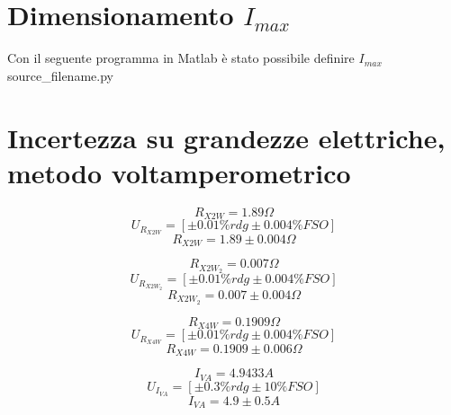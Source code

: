 \documentclass[a4paper]{article}
\begin{document}
\section{Dimensionamento $I_{max}$}
Con il seguente programma in Matlab è stato possibile definire $I_{max}$
{source_filename.py}
\section {Incertezza su grandezze elettriche, metodo voltamperometrico}

\begin{Large}
	\begin{equation}
		R_{X2W}= 1.89 \Omega
	\end{equation}
	\begin{equation}
		U_{R_{X2W}} = [\pm 0.01\%rdg \pm 0.004\% FSO]
	 \end{equation}
	 \begin{equation}
		R_{X2W} = 1.89 \pm 0.004 \Omega
	 \end{equation}
\end{Large}

\begin{Large}
	\begin{equation}
		R_{X2W_{2}} = 0.007 \Omega
	 \end{equation}
	\begin{equation}
		U_{R_{X2W_{2}}} = [\pm 0.01\%rdg \pm 0.004\% FSO]
	 \end{equation}
	 \begin{equation}
		R_{X2W_{2}} = 0.007 \pm 0.004 \Omega
	 \end{equation}
\end{Large}

\begin{Large}
	\begin{equation}
		R_{X4W}= 0.1909 \Omega
	\end{equation}
	\begin{equation}
		U_{R_{X4W}} = [\pm 0.01\%rdg \pm 0.004\% FSO]
	 \end{equation}
	 \begin{equation}
		R_{X4W} = 0.1909\pm 0.006 \Omega
	 \end{equation}
\end{Large}

\begin{Large}
	\begin{equation}
		I_{VA}= 4.9433 A
	\end{equation}
	\begin{equation}
		U_{I_{VA}} = [\pm 0.3\%rdg \pm 10\% FSO]
	 \end{equation}
	 \begin{equation}
		I_{VA} = 4.9 \pm 0.5 A
	 \end{equation}
\end{Large}
\end{document}
